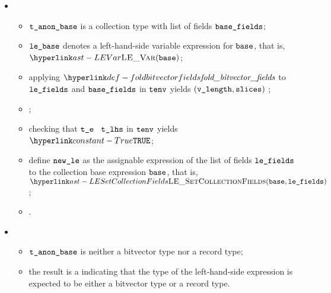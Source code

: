 \begin{itemize}
\begin{itemize}
    \item {}
    \begin{itemize}
      \item $\texttt{t\_anon\_base}$ is a collection type with list of fields
        $\texttt{base\_fields}$;
      \item $\texttt{le\_base}$ denotes a left-hand-side variable expression for
        $\texttt{base}$, that is, $\LEVar(\vbase)$;
      \item applying $\foldbitvectorfields$ to $\texttt{le\_fields}$ and $\texttt{base\_fields}$
        in $\texttt{tenv}$ yields $(\texttt{v\_length}, \texttt{slices})$ \ProseOrTypeError;
      \item {};
      \item checking that $\texttt{t\_e}$ \typesatisfies\ $\texttt{t\_lhs}$ in $\texttt{tenv}$ yields
        $\True$\ProseOrTypeError;
      \item define $\texttt{new\_le}$ as the assignable expression of the list of fields
        $\texttt{le\_fields}$ to the collection base expression $\texttt{base}$, that is, \\
        $\LESetCollectionFields(\vbase, \vlefields)$;
      \item \Proseeqdef{$\vses$}{$\vsesbase$}.
    \end{itemize}

    \item {}
    \begin{itemize}
      \item $\texttt{t\_anon\_base}$ is neither a bitvector type nor a record type;
      \item the result is a \typingerrorterm{} indicating that the type of the left-hand-side expression is expected to be
            either a bitvector type or a record type.
    \end{itemize}
  \end{itemize}
\end{itemize}

